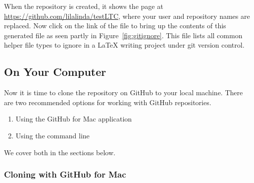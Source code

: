 When the repository is created, it shows the page at \url{https://github.com/lilalinda/testLTC}, where your user and repository names are replaced.  Now click on the link of the file  to bring up the contents of this generated file as seen partly in Figure~\ref{fig:gitignore}.  This file lists all common helper file types to ignore in a LaTeX writing project under git version control.

\subsection{On Your Computer} \label{sec:cloning}

Now it is time to clone the repository on GitHub to your local machine.  There are two recommended options for working with GitHub repositories.
\begin{enumerate}
\item Using the GitHub for Mac application 
\item Using the command line
\end{enumerate}
We cover both in the sections below.

\subsubsection{Cloning with GitHub for Mac}

